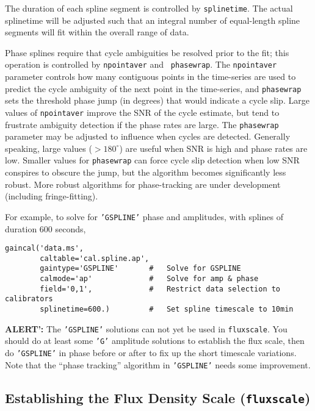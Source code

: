 The duration of each spline segment is controlled by {\tt splinetime}.
The actual splinetime will be adjusted such that an integral number of
equal-length spline segments will fit within the overall range of
data.

Phase splines require that cycle ambiguities be resolved prior to the
fit; this operation is controlled by {\tt npointaver} and {\tt
phasewrap}.  The {\tt npointaver} parameter controls how many
contiguous points in the time-series are used to predict the cycle
ambiguity of the next point in the time-series, and {\tt phasewrap} sets
the threshold phase jump (in degrees) that would indicate a cycle
slip.  Large values of {\tt npointaver} improve the SNR of the cycle
estimate, but tend to frustrate ambiguity detection if the phase rates
are large.  The {\tt phasewrap} parameter may be adjusted to influence
when cycles are detected.  Generally speaking, large values
($>180^\circ$) are useful when SNR is high and phase rates are
low. Smaller values for {\tt phasewrap} can force cycle slip detection
when low SNR conspires to obscure the jump, but the algorithm becomes
significantly less robust.  More robust algorithms for phase-tracking
are under development (including fringe-fitting).

For example, to solve for {\tt 'GSPLINE'} phase and amplitudes, with
splines of duration 600 seconds, 
\small
\begin{verbatim}
gaincal('data.ms',
        caltable='cal.spline.ap',
        gaintype='GSPLINE'       #   Solve for GSPLINE
        calmode='ap'             #   Solve for amp & phase
        field='0,1',             #   Restrict data selection to calibrators
        splinetime=600.)         #   Set spline timescale to 10min
\end{verbatim}
\normalsize

{\bf ALERT':} The {\tt 'GSPLINE'} solutions can not yet be
used in {\tt fluxscale}.  You should do at least some {\tt 'G'}
amplitude solutions to establish the flux scale, then do 
{\tt 'GSPLINE'} in phase before or after to fix up the short 
timescale variations.  Note that the ``phase tracking'' algorithm
in {\tt 'GSPLINE'} needs some improvement.

\subsection{Establishing the Flux Density Scale ({\tt fluxscale}) }
\label{section:cal.solve.fluxscale}


